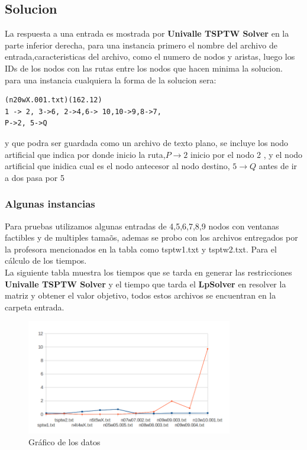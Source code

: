 \documentclass[journal, a4paper]{IEEEtran}
\begin{document}
\subsection{Solucion}
La respuesta a una entrada es mostrada por \textbf{Univalle TSPTW Solver} en la parte inferior derecha,
para una instancia primero el nombre del archivo de entrada,caracteristicas del archivo, 
como el numero de nodos y aristas, luego los IDs de los nodos con las rutas entre los nodos 
que hacen minima la solucion.\\
para una instancia cualquiera la forma de la solucion sera:
\begin{lstlisting}[frame=single]
(n20wX.001.txt)(162.12) 
1 -> 2, 3->6, 2->4,6-> 10,10->9,8->7,
P->2, 5->Q
\end{lstlisting}
y que podra ser guardada como un archivo de texto plano, se incluye los nodo artificial
que indica por donde inicio la ruta,\textbf{\(P\to2\)} inicio por el nodo 2 , y el nodo artificial
que inidica cual es el nodo antecesor al nodo destino, \textbf{\(5\to Q\)} antes de ir a dos pasa por 5\\
\subsubsection{Algunas instancias}
Para pruebas utilizamos algunas entradas de 4,5,6,7,8,9 nodos con ventanas factibles 
y de multiples tama\~os, ademas se probo con los archivos entregados por la profesora mencionados en la
tabla como tsptw1.txt y tsptw2.txt. Para el c\'alculo de los tiempos.\\ 
La siguiente tabla muestra los tiempos que se tarda en generar las restricciones 
\textbf{Univalle TSPTW Solver} y el tiempo que tarda el \textbf{LpSolver} en resolver la matriz
y obtener el valor objetivo, todos estos archivos se encuentran en la carpeta entrada.
\begin{figure}[H]
\centering
  \includegraphics[width=90mm]{img.png}
  \caption{Gr\'afico de los datos}
\end{figure}
\end{document}
